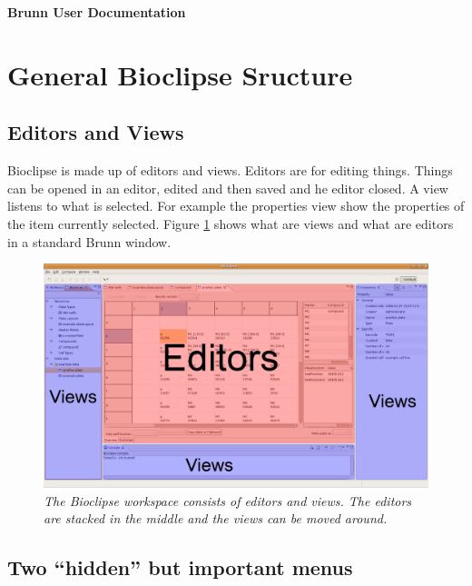 \documentclass[a4paper,10pt]{article}
\begin{document}
    \huge 
    \noindent
    \textbf{Brunn User Documentation}

    \normalsize

    \section{General Bioclipse Sructure}

        \subsection{Editors and Views}
            Bioclipse is made up of editors and views. Editors are for editing
            things. Things can be opened in an editor, edited and then saved
            and he editor closed. A view listens to what is selected. For
            example the properties view show the properties of the item
            currently selected. Figure \ref{editorsAndViews} shows what are
            views and what are editors in a standard Brunn window.
            \begin{figure}[htbp]
                \begin{center}
                    \includegraphics[width=1\textwidth]{images/EditorsViews.png}
                \end{center}
                \caption{\textit{The Bioclipse workspace consists of editors
                                 and views. The editors are stacked in the
                                 middle and the views can be moved around.}}
                \label{editorsAndViews}
            \end{figure}

        \subsection{Two ``hidden'' but important menus}
\end{document}
